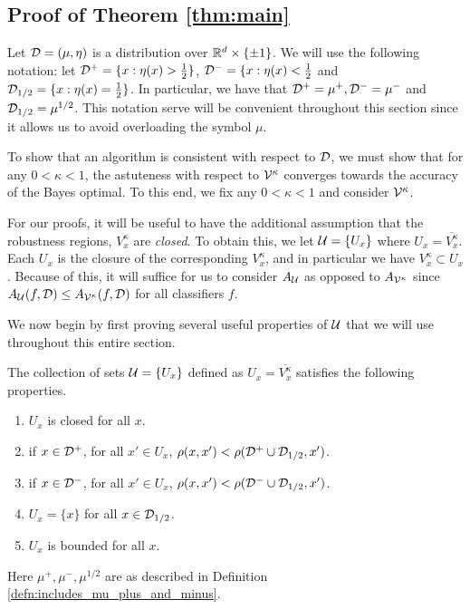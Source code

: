 \subsection{Proof of Theorem \ref{thm:main}}

Let ${\mathcal D} = (\mu, \eta)$ is a distribution over $\mathbb R^d \times \{\pm 1\}$. We will use the following notation: let ${\mathcal D}^+ = \{x: \eta(x) > \frac{1}{2}\}$, ${\mathcal D}^- = \{x: \eta(x) < \frac{1}{2}$ and ${\mathcal D}_{1/2} = \{x: \eta(x) = \frac{1}{2}\}$. In particular, we have that ${\mathcal D}^+ = \mu^+, {\mathcal D}^- = \mu^-$ and ${\mathcal D}_{1/2} = \mu^{1/2}$. This notation serve will be convenient throughout this section since it allows us to avoid overloading the symbol $\mu$. 

To show that an algorithm is \ncons\emph{ }consistent with respect to ${\mathcal D}$, we must show that for any $0 < \kappa < 1$, the astuteness with respect to ${\mathcal V}^\kappa$ converges towards the accuracy of the Bayes optimal. To this end, we fix any $0 < \kappa < 1$ and consider ${\mathcal V}^\kappa$. 

For our proofs, it will be useful to have the additional assumption that the robustness regions, $V_x^\kappa$ are \textit{closed}. To obtain this, we let ${\mathcal U} = \{U_x\}$ where $U_x = \overline{V_x^\kappa}$. Each $U_x$ is the closure of the corresponding $V_x^{\kappa}$, and in particular we have $V_x^{\kappa} \subset U_x$. Because of this, it will suffice for us to consider $A_{\mathcal U}$ as opposed to $A_{{\mathcal V}^\kappa}$ since $A_{\mathcal U}(f, {\mathcal D}) \leq A_{{\mathcal V}^\kappa}(f, {\mathcal D})$ for all classifiers $f$.

We now begin by first proving several useful properties of ${\mathcal U}$ that we will use throughout this entire section. 

\begin{lem}\label{lem:u_is_npr}
The collection of sets ${\mathcal U} = \{U_x\}$ defined as $U_x = \overline{V_x^\kappa}$ satisfies the following properties. 
\begin{enumerate}
	\item $U_x$ is closed for all $x$. 
	\item if $x \in {\mathcal D}^+$, for all $x' \in U_x$, $\rho(x, x') < \rho({\mathcal D}^+ \cup {\mathcal D}_{1/2}, x')$.
	\item if $x \in {\mathcal D}^-$, for all $x' \in U_x$, $\rho(x, x') < \rho({\mathcal D}^- \cup {\mathcal D}_{1/2}, x')$. 
	\item $U_x = \{x\}$ for all $x \in {\mathcal D}_{1/2}$. 
	\item $U_x$ is bounded for all $x$.
\end{enumerate}
Here $\mu^+, \mu^-, \mu^{1/2}$ are as described in Definition \ref{defn:includes_mu_plus_and_minus}. 
\end{lem}

